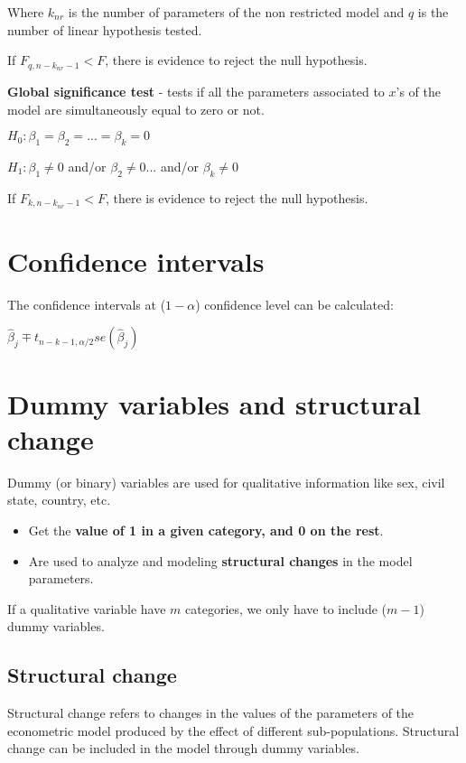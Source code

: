 \documentclass[10pt, a4paper, landscape]{extarticle}
\begin{document}
\begin{multicols}{3}
Where $k_{nr}$ is the number of parameters of the non restricted model and $q$ is the number of linear hypothesis tested.

If $F_{q, n-k_{nr}-1} < F$, there is evidence to reject the null hypothesis.

\textbf{Global significance test} - tests if all the parameters associated to $x$'s of the model are simultaneously equal to zero or not.

$H_0: \beta_1 = \beta_2 = ... = \beta_k = 0$

$H_1: \beta_1 \neq 0$ and/or $\beta_2 \neq 0 ...$ and/or $\beta_k \neq 0$

If $F_{k, n-k_{nr}-1} < F$, there is evidence to reject the null hypothesis.

\section*{Confidence intervals}

The confidence intervals at ($1 - \alpha$) confidence level can be calculated:

\begin{center}
$\hat{\beta}_j \mp t_{n-k-1, \alpha/2} se(\hat{\beta}_j)$
\end{center}

\section*{Dummy variables and structural change}

Dummy (or binary) variables are used for qualitative information like sex, civil state, country, etc.

\begin{itemize}[leftmargin=*]
\item Get the \textbf{value of 1 in a given category, and 0 on the rest}.
\item Are used to analyze and modeling \textbf{structural changes} in the model parameters.
\end{itemize}

If a qualitative variable have $m$ categories, we only have to include ($m-1$) dummy variables.

\subsection*{Structural change}

Structural change refers to changes in the values of the parameters of the econometric model produced by the effect of different sub-populations. Structural change can be included in the model through dummy variables.


\end{multicols}
\end{document}
